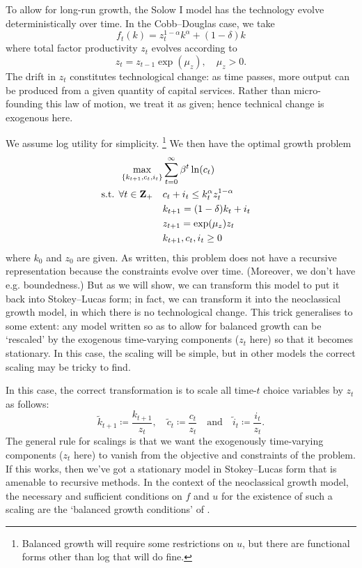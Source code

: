 \documentclass[11pt,letterpaper,reqno,oneside]{article}
\begin{document}
To allow for long-run growth, the Solow I model has the technology evolve deterministically over time. In the Cobb--Douglas case, we take
%
\begin{equation*}
	f_t(k) = z_t^{1-\alpha} k^\alpha + (1-\delta) k
\end{equation*}
%
where total factor productivity $z_t$ evolves according to
%
\begin{equation*}
	z_t = z_{t-1} \exp(\mu_z), \quad \mu_z > 0 .
\end{equation*}
%
The drift in $z_t$ constitutes technological change: as time passes, more output can be produced from a given quantity of capital services. Rather than micro-founding this law of motion, we treat it as given; hence technical change is exogenous here.

We assume log utility for simplicity.%
	\footnote{Balanced growth will require some restrictions on $u$, but there are functional forms other than log that will do fine.}
We then have the optimal growth problem
%
\begin{align*}
	\max_{\{k_{t+1},c_t,i_t\}}
	&\sum_{t=0}^\infty \beta^t \ln (c_t) &
	\\
	\text{s.t. $\forall t \in \mathbf{Z}_+$}\quad
	&c_t + i_t \leq k_t^\alpha z_t^{1-\alpha} 
	\\
	&k_{t+1} = (1-\delta) k_t + i_t 
	\\
	&z_{t+1} = \exp(\mu_z) z_t 
	\\
	&k_{t+1}, c_t, i_t \geq 0
\end{align*}
%
where $k_0$ and $z_0$ are given. As written, this problem does not have a recursive representation because the constraints evolve over time. (Moreover, we don't have e.g. boundedness.) But as we will show, we can transform this model to put it back into Stokey--Lucas form; in fact, we can transform it into the neoclassical growth model, in which there is no technological change. This trick generalises to some extent: any model written so as to allow for balanced growth can be `rescaled' by the exogenous time-varying components ($z_t$ here) so that it becomes stationary. In this case, the scaling will be simple, but in other models the correct scaling may be tricky to find.

In this case, the correct transformation is to scale all time-$t$ choice variables by $z_t$ as follows:
%
\begin{equation*}
	\widetilde{k}_{t+1} \coloneqq \frac{k_{t+1}}{z_t} ,
	\quad
	\widetilde{c}_t \coloneqq \frac{c_t}{z_t}
	\quad\text{and}\quad
	\widetilde{i}_t \coloneqq \frac{i_t}{z_t} .
\end{equation*}
%
The general rule for scalings is that we want the exogenously time-varying components ($z_t$ here) to vanish from the objective and constraints of the problem. If this works, then we've got a stationary model in Stokey--Lucas form that is amenable to recursive methods. In the context of the neoclassical growth model, the necessary and sufficient conditions on $f$ and $u$ for the existence of such a scaling are the `balanced growth conditions' of \textcite{KingPlosserRebelo1988}.
\end{document}
